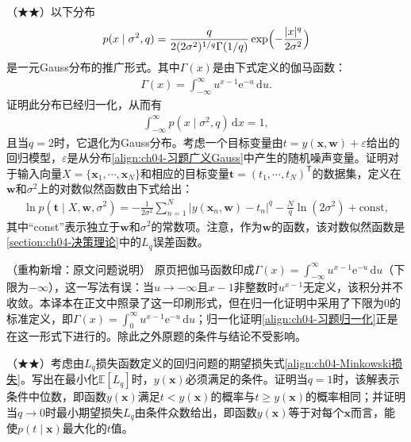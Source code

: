 \documentclass[../../main.tex]{subfiles}
\begin{document}
\begin{exercise}\label{exercise:ch04-11}
（★★）以下分布
\begin{align}
  p(x\mid\sigma^2,q)=\frac{q}{2(2\sigma^2)^{1/q}\Gamma(1/q)}\exp\Bigl(-\frac{|x|^q}{2\sigma^2}\Bigr)
  \label{align:ch04-习题广义Gauss}
\end{align}
是一元Gauss分布的推广形式。其中$\Gamma(x)$是由下式定义的伽马函数：
\begin{align}
  \Gamma(x)=\int_{-\infty}^{\infty}u^{x-1}\mathrm{e}^{-u}\,\mathrm{d}u .
  \label{align:ch04-习题伽马函数}
\end{align}
证明此分布已经归一化，从而有
\begin{align}
  \int_{-\infty}^{\infty}p(x\mid\sigma^2,q)\,\mathrm{d}x=1,
  \label{align:ch04-习题归一化}
\end{align}
且当$q=2$时，它退化为Gauss分布。考虑一个目标变量由$t=y(\boldsymbol{x},\boldsymbol{w})+\varepsilon$给出的回归模型，$\varepsilon$是从分布\eqref{align:ch04-习题广义Gauss}中产生的随机噪声变量。证明对于输入向量$X=\{\boldsymbol{x}_1,\cdots,\boldsymbol{x}_N\}$和相应的目标变量$\boldsymbol{t}=(t_1,\cdots,t_N)^{\mathsf{T}}$的数据集，定义在$\boldsymbol{w}$和$\sigma^2$上的对数似然函数由下式给出：
\begin{align}
  \ln p(\boldsymbol{t}\mid X,\boldsymbol{w},\sigma^2)=-\frac{1}{2\sigma^2}\sum_{n=1}^{N}\bigl|y(\boldsymbol{x}_n,\boldsymbol{w})-t_n\bigr|^q-\frac{N}{q}\ln(2\sigma^2)+\text{const},
  \label{align:ch04-习题广义对数似然}
\end{align}
其中“const”表示独立于$\boldsymbol{w}$和$\sigma^2$的常数项。注意，作为$\boldsymbol{w}$的函数，该对数似然函数是\cref{section:ch04-决策理论}中的$L_q$误差函数。
\end{exercise}

\begin{remark}（重构新增：原文问题说明）
原页把伽马函数印成$\Gamma(x)=\int_{-\infty}^{\infty}u^{x-1}\mathrm{e}^{-u}\,\mathrm{d}u$（下限为$-\infty$），这一写法有误：当$u\to-\infty$且$x-1$非整数时$u^{x-1}$无定义，该积分并不收敛。本译本在正文中照录了这一印刷形式，但在归一化证明中采用了下限为$0$的标准定义，即$\Gamma(x)=\int_{0}^{\infty}u^{x-1}\mathrm{e}^{-u}\,\mathrm{d}u$；归一化证明\eqref{align:ch04-习题归一化}正是在这一形式下进行的。除此之外原题的条件与结论不受影响。
\end{remark}

\begin{exercise}\label{exercise:ch04-12}
（★★）考虑由$L_q$损失函数定义的回归问题的期望损失式\eqref{align:ch04-Minkowski损失}。写出在最小化$\mathbb{E}[L_q]$时，$y(\boldsymbol{x})$必须满足的条件。证明当$q=1$时，该解表示条件中位数，即函数$y(\boldsymbol{x})$满足$t<y(\boldsymbol{x})$的概率与$t\geqslant y(\boldsymbol{x})$的概率相同；并证明当$q\to0$时最小期望损失$L_q$由条件众数给出，即函数$y(\boldsymbol{x})$等于对每个$\boldsymbol{x}$而言，能使$p(t\mid\boldsymbol{x})$最大化的$t$值。
\end{exercise}
\end{document}
